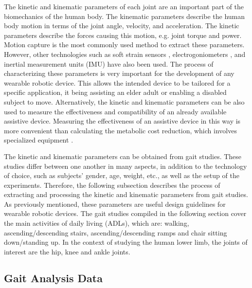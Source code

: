 The kinetic and kinematic parameters of each joint are an important part of the biomechanics of the human body. The kinematic parameters describe the human body motion in terms of the joint angle, velocity, and acceleration. The kinetic
parameters describe the forces causing this motion, e.g. joint torque and power. Motion capture is the most commonly used method to extract these parameters. However, other technologies such as soft strain sensors \cite{mengucc2014wearable}, electrogoniometers \cite{wu2011electromyography}, and inertial measurement units (IMU) have also been used. The process of characterizing these parameters is very important for the development of any wearable robotic device. This allows the intended device to be tailored for a specific application, it being assisting an elder adult or enabling a disabled subject to move. Alternatively, the kinetic and kinematic parameters can be also used to measure the effectiveness and compatibility of an already available assistive device. Measuring the effectiveness of an assistive device in this way is more convenient than calculating the metabolic cost reduction, which involves specialized equipment \cite{panizzolo2016biologically}. 

The kinetic and kinematic parameters can be obtained from gait studies. These studies differ between one another in many aspects, in addition to the technology of choice, such as subjects' gender, age, weight, etc., as well as the setup of the experiments. Therefore, the following subsection describes the process of extracting and processing the kinetic and kinematic parameters from gait studies. As previously mentioned, these parameters are useful design guidelines for wearable robotic devices. The gait studies compiled in the following section cover the main activities of daily living (ADLs), which are: walking, ascending/descending stairs, ascending/descending ramps and chair sitting down/standing up. In the context of studying the human lower limb, the joints of interest are the hip, knee and ankle joints.

\subsection{Gait Analysis Data}

